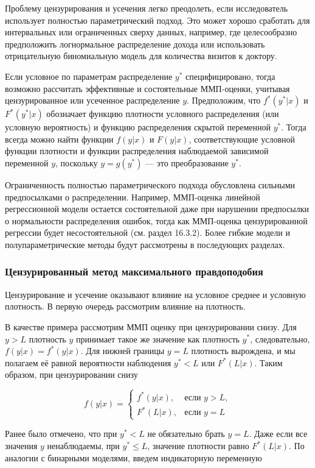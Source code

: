 Проблему цензурирования и усечения легко преодолеть, если исследователь использует полностью параметрический подход. Это может хорошо сработать для интервальных или ограниченных сверху данных, например, где целесообразно предположить логнормальное распределение дохода или использовать отрицательную биномиальную модель для количества визитов к доктору.

Если условное по параметрам распределение $y^* $ специфицировано, тогда возможно рассчитать эффективные и состоятельные ММП-оценки, учитывая цензурированное или усеченное распределение $y$. Предположим, что $f^{*}(y^* |x)$ и $F^{*}(y^* |x)$ обозначает функцию плотности условного распределения (или условную вероятность) и функцию распределения скрытой переменной $y^* $. Тогда всегда можно найти функции $f(y|x)$ и $F(y|x)$, соответствующие условной функции плотности и функции распределения наблюдаемой зависимой переменной $y$, поскольку $y=g(y^* )$ --- это преобразование $y^* $.

Ограниченность полностью параметрического подхода обусловлена сильными предпосылками о распределении. Например, ММП-оценка линейной регрессионной модели остается состоятельной даже при нарушении предпосылки о нормальности распределения ошибок, тогда как ММП-оценка цензурированной регрессии будет несостоятельной (см. раздел 16.3.2). Более гибкие модели и полупараметрические методы будут рассмотрены в последующих разделах. 


\subsubsection*{Цензурированный метод максимального правдоподобия}


Цензурирование и усечение оказывают влияние на условное среднее и условную плотность. В первую очередь рассмотрим влияние на плотность.


В качестве примера рассмотрим ММП оценку при цензурировании снизу. Для $y>L$ плотность $y$ принимает такое же значение как плотность $y^* $, следовательно, $f(y|x)=f^{*}(y|x)$. Для нижней границы $y=L$ плотность вырождена, и мы полагаем её равной вероятности наблюдения $y^* <L$ или $F^{*}(L|x)$. Таким образом, при цензурировании снизу 

\[
f(y|x)=
\begin{cases}
f^{*}(y|x),& \text{если $y>L$},\\
F^{*}(L|x),& \text{если $y=L$}
\end{cases}
\]


Ранее было отмечено, что при $y^* <L$ не обязательно брать $y=L$. Даже если все значения $y$ ненаблюдаемы, при $y^*  \leq L$, значение плотности равно $F^{*}(L|x)$. По аналогии с бинарными моделями, введем индикаторную переменную 

